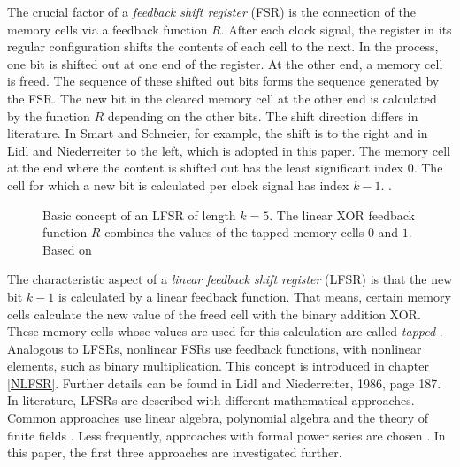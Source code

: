 The crucial factor of a \textit{feedback shift register} (FSR) is the connection of the memory cells via a feedback function $R$. After each clock signal, the register in its regular configuration shifts the contents of each cell to the next. In the process, one bit is shifted out at one end of the register. At the other end, a memory cell is freed. The sequence of these shifted out bits forms the sequence generated by the FSR. The new bit in the cleared memory cell at the other end is calculated by the function $R$ depending on the other bits. The shift direction differs in literature. In Smart and Schneier, for example, the shift is to the right \cite[p. 227]{Smart.2016}\cite[p. 429]{Schneier.2006} and in Lidl and Niederreiter to the left, which is adopted in this paper. The memory cell at the end where the content is shifted out has the least significant index $0$. The cell for which a new bit is calculated per clock signal has index $k-1$. \cite[pp. 186-187]{Lidl.1986}.
\begin{figure}[h]
	\centering
	
	\caption{Basic concept of an LFSR of length $k=5$. The linear XOR feedback function $R$ combines the values of the tapped memory cells $0$ and $1$. Based on \cite[p. 430]{Schneier.2006}}
	\label{fig:Figure_3}
\end{figure}

The characteristic aspect of a \textit{linear feedback shift register} (LFSR) is that the new bit $k-1$ is calculated by a linear feedback function. That means, certain memory cells calculate the new value of the freed cell with the binary addition XOR. \cite[p. 82]{Stamp.2007} These memory cells whose values are used for this calculation are called \textit{tapped} \cite[p. 227]{Smart.2016}. Analogous to LFSRs, nonlinear FSRs use feedback functions, with nonlinear elements, such as binary multiplication. This concept is introduced in chapter \ref{NLFSR}. Further details can be found in Lidl and Niederreiter, 1986, page 187. \\

In literature, LFSRs are described with different mathematical approaches. Common approaches use linear algebra, polynomial algebra and the theory of finite fields \cite[pp. 186ff.]{Lidl.1986}\cite[pp. 228ff.]{Smart.2016}. Less frequently, approaches with formal power series are chosen \cite[pp. 53ff.]{Beutelspacher.2005}\cite[pp. 201ff.]{Rueppel.1986}. In this paper, the first three approaches are investigated further. \\

